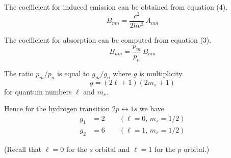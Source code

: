 \documentclass[12pt]{article}
\newcommand\BNM{B_{nm}} %
\newcommand\BMN{B_{mn}} %
\newcommand\AMN{A_{mn}} %
\begin{document}
\noindent
The coefficient for induced emission can be obtained from equation (4).
\begin{equation*}
\BMN=\frac{c^2}{2h\nu^3}\,\AMN
\end{equation*}

\noindent
The coefficient for absorption can be computed from equation (3).
\begin{equation*}
\BNM=\frac{p_m}{p_n}\,\BMN
\end{equation*}

\noindent
The ratio $p_m/p_n$ is equal to $g_m/g_n$ where $g$ is multiplicity
\begin{equation*}
g=(2\ell+1)(2m_s+1)
\end{equation*}
for quantum numbers $\ell$ and $m_s$.

\bigskip
\noindent
Hence for the hydrogen transition $2p\leftrightarrow1s$ we have
\begin{align*}
g_1&=2\qquad(\ell=0,\,m_s=1/2)
\\
g_2&=6\qquad(\ell=1,\,m_s=1/2)
\end{align*}

\noindent
(Recall that $\ell=0$ for the $s$ orbital and $\ell=1$ for the $p$ orbital.)
\end{document}
